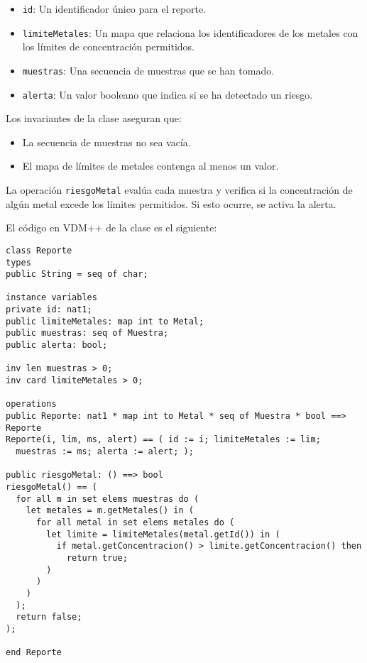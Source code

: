 \begin{itemize}
    \item \texttt{id}: Un identificador único para el reporte.
    \item \texttt{limiteMetales}: Un mapa que relaciona los identificadores de los metales con los límites de concentración permitidos.
    \item \texttt{muestras}: Una secuencia de muestras que se han tomado.
    \item \texttt{alerta}: Un valor booleano que indica si se ha detectado un riesgo.
\end{itemize}

Los invariantes de la clase aseguran que:

\begin{itemize}
    \item La secuencia de muestras no sea vacía.
    \item El mapa de límites de metales contenga al menos un valor.
\end{itemize}

La operación \texttt{riesgoMetal} evalúa cada muestra y verifica si la concentración de algún metal excede los límites permitidos. Si esto ocurre, se activa la alerta.

El código en VDM++ de la clase es el siguiente:

\begin{lstlisting}
class Reporte
types
public String = seq of char;

instance variables
private id: nat1;
public limiteMetales: map int to Metal;
public muestras: seq of Muestra;
public alerta: bool;

inv len muestras > 0;
inv card limiteMetales > 0;

operations
public Reporte: nat1 * map int to Metal * seq of Muestra * bool ==> Reporte
Reporte(i, lim, ms, alert) == ( id := i; limiteMetales := lim;
  muestras := ms; alerta := alert; );

public riesgoMetal: () ==> bool
riesgoMetal() == (
  for all m in set elems muestras do (
    let metales = m.getMetales() in (
      for all metal in set elems metales do (
        let limite = limiteMetales(metal.getId()) in (
          if metal.getConcentracion() > limite.getConcentracion() then
            return true;
        )
      )
    )
  );
  return false;
);

end Reporte
\end{lstlisting}
